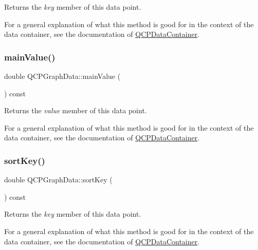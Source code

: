 Returns the {\itshape key} member of this data point.

For a general explanation of what this method is good for in the context of the data container, see the documentation of \hyperlink{classQCPDataContainer}{Q\+C\+P\+Data\+Container}. \mbox{\label{classQCPGraphData_a1b1e440a430a4a83d9a3f6f247510f27}} 
\subsubsection{\texorpdfstring{main\+Value()}{mainValue()}}
{\footnotesize\ttfamily double Q\+C\+P\+Graph\+Data\+::main\+Value (\begin{DoxyParamCaption}{ }\end{DoxyParamCaption}) const\hspace{0.3cm}{\ttfamily [inline]}}

Returns the {\itshape value} member of this data point.

For a general explanation of what this method is good for in the context of the data container, see the documentation of \hyperlink{classQCPDataContainer}{Q\+C\+P\+Data\+Container}. \mbox{\label{classQCPGraphData_a5e0f37ea101eeec245d8c32a2206b204}} 
\subsubsection{\texorpdfstring{sort\+Key()}{sortKey()}}
{\footnotesize\ttfamily double Q\+C\+P\+Graph\+Data\+::sort\+Key (\begin{DoxyParamCaption}{ }\end{DoxyParamCaption}) const\hspace{0.3cm}{\ttfamily [inline]}}

Returns the {\itshape key} member of this data point.

For a general explanation of what this method is good for in the context of the data container, see the documentation of \hyperlink{classQCPDataContainer}{Q\+C\+P\+Data\+Container}. \mbox{\label{classQCPGraphData_a1c98dfd21b82321a173db4ff860dfd21}} 
